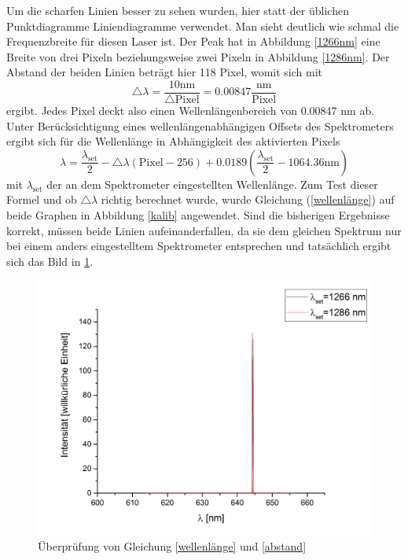 Um die scharfen Linien besser zu sehen wurden, hier statt der üblichen Punktdiagramme Liniendiagramme verwendet. Man sieht deutlich wie schmal die Frequenzbreite für diesen Laser ist. Der Peak hat in Abbildung \ref{1266nm} eine Breite von drei Pixeln beziehungsweise zwei Pixeln in Abbildung \ref{1286nm}. Der Abstand der beiden Linien beträgt hier 118 Pixel, womit sich mit 
\begin{equation}
\triangle\lambda=\frac{10\text{nm}}{\triangle\text{Pixel}}=0.00847 \frac{\text{nm}}{\text{Pixel}}
\label{abstand}
\end{equation}
ergibt. Jedes Pixel deckt also einen Wellenlängenbereich von 0.00847 nm ab. Unter Berücksichtigung eines wellenlängenabhängigen Offsets des Spektrometers ergibt sich für die Wellenlänge in Abhängigkeit des aktivierten Pixels
\begin{equation}
\lambda=\frac{\lambda_{\text{set}}}{2}-\triangle\lambda(\text{Pixel}-256)+0.0189\left(\frac{\lambda_{\text{set}}}{2}-1064.36\text{nm}\right)
\label{wellenlänge}
\end{equation}
mit $\lambda_{\text{set}}$ der an dem Spektrometer eingestellten Wellenlänge. Zum Test dieser Formel und ob $\triangle\lambda$ richtig berechnet wurde, wurde Gleichung (\ref{wellenlänge}) auf beide Graphen in Abbildung \ref{kalib} angewendet. Sind die bisherigen Ergebnisse korrekt, müssen beide Linien aufeinanderfallen, da sie dem gleichen Spektrum nur bei einem anders eingestelltem Spektrometer entsprechen und tatsächlich ergibt sich das Bild in \ref{test}.
\begin{figure}[H]
	\begin{center}
		\includegraphics[scale=.5]{Bilder/Test.png}
		\caption{Überprüfung von Gleichung \ref{wellenlänge} und \ref{abstand}}
		\label{test}
	\end{center}
\end{figure}
